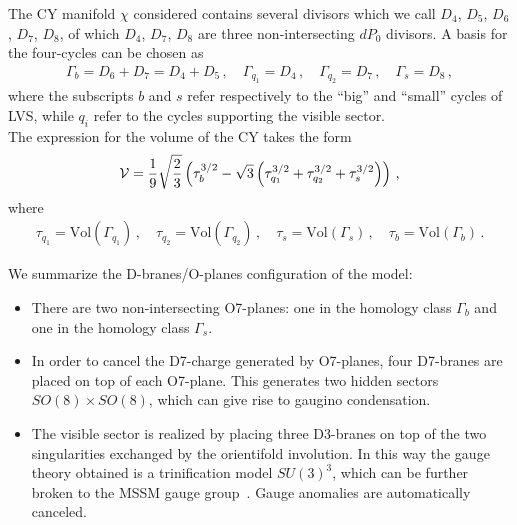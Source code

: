 \documentclass[12pt,a4paper]{book}
\newcommand{\V}{{\cal{V}}}
\begin{document}
The CY manifold $\chi$ considered contains several divisors which we call $D_4$, $D_5$, $D_6$, $D_7$, $D_8$, of which $D_4$, $D_7$, $D_8$ are three non-intersecting $dP_0$ divisors. A basis for the four-cycles can be chosen as
\begin{align}
\label{eq:BasisH11}
\Gamma_b = D_6 + D_7 = D_4 + D_5 \,, \quad \Gamma_{q_1} = D_4 \,, \quad \Gamma_{q_2} = D_7 \,, \quad \Gamma_s = D_8 \,,
\end{align}
where the subscripts $b$ and $s$ refer respectively to the ``big'' and ``small'' cycles of LVS, while $q_i$ refer to the cycles supporting the visible sector.\\

The expression for the volume of the CY takes the form
\begin{align}
\label{eq:VolumeExplicitCY}
\V = \frac{1}{9} \sqrt{\frac{2}{3}} \left(\tau_b^{3/2} - \sqrt{3} \left(\tau_{q_1}^{3/2} + \tau_{q_2}^{3/2} + \tau_s^{3/2}\right)\right)\,,
\end{align}
where
\begin{align}
\label{eq:CyclesExplicit}
\tau_{q_1} = \text{Vol}(\Gamma_{q_1}) \,, \quad \tau_{q_2} = \text{Vol}(\Gamma_{q_2}) \,, \quad \tau_s = \text{Vol}(\Gamma_s) \,, \quad \tau_b = \text{Vol}(\Gamma_b)\,.
\end{align}

We summarize the D-branes/O-planes configuration of the model:
\begin{itemize}
\item There are two non-intersecting O7-planes: one in the homology class $\Gamma_b$ and one in the homology class $\Gamma_s$.
\item In order to cancel the D7-charge generated by O7-planes, four D7-branes are placed on top of each O7-plane. This generates two hidden sectors $SO(8) \times SO(8)$, which can give rise to gaugino condensation.
\item The visible sector is realized by placing three D3-branes on top of the two singularities exchanged by the orientifold involution. In this way the gauge theory obtained is a trinification model $SU(3)^3$, which can be further broken to the MSSM gauge group~\cite{Cicoli:2012vw}. Gauge anomalies are automatically canceled.
\end{itemize}
\end{document}
